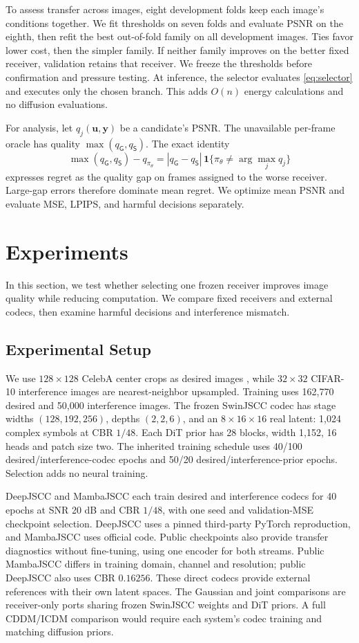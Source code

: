 \documentclass[conference]{IEEEtran}
\newcommand{\G}{\mathsf{G}}
\newcommand{\SIC}{\mathsf{S}}
\begin{document}
To assess transfer across images, eight development folds keep each image's
conditions together. We fit thresholds on seven folds and evaluate PSNR on
the eighth, then refit the best out-of-fold family on all development images.
Ties favor lower cost, then the simpler family. If neither
family improves on the better fixed receiver, validation retains that receiver.
We freeze the thresholds before confirmation and pressure testing. At inference,
the selector evaluates \eqref{eq:selector} and executes only the chosen branch.
This adds $O(n)$ energy calculations and no diffusion evaluations.

For analysis, let $q_j(\bm u,\bm y)$ be a candidate's PSNR. The unavailable
per-frame oracle has quality $\max(q_\G,q_\SIC)$. The exact identity
\begin{equation}
 \max(q_\G,q_\SIC)-q_{\pi_\theta}
 =|q_\G-q_\SIC|\,
 \mathbf1\{\pi_\theta\ne\arg\max_j q_j\}
 \label{eq:regret}
\end{equation}
expresses regret as the quality gap on frames assigned to the worse receiver.
Large-gap errors therefore dominate mean regret. We optimize mean PSNR and
evaluate MSE, LPIPS, and harmful decisions separately.

\section{Experiments}
\label{sec:experiments}
In this section, we test whether selecting one frozen receiver improves image
quality while reducing computation. We compare fixed receivers and external
codecs, then examine harmful decisions and interference mismatch.

\subsection{Experimental Setup}
We use $128\times128$ CelebA center crops as desired images
\cite{liu2015celeba}, while
$32\times32$ CIFAR-10 interference images are nearest-neighbor upsampled.
Training uses 162,770 desired and 50,000 interference images. The frozen
SwinJSCC codec has stage widths $(128,192,256)$, depths $(2,2,6)$, and an
$8\times16\times16$ real latent: 1,024 complex symbols at CBR $1/48$.
Each DiT prior has 28 blocks, width 1,152, 16 heads and patch size two.
The inherited training schedule uses 40/100 desired/interference-codec epochs
and 50/20 desired/interference-prior epochs. Selection adds no neural training.

DeepJSCC and MambaJSCC each train desired and interference codecs for 40 epochs
at SNR 20 dB and CBR $1/48$, with one seed and validation-MSE checkpoint
selection. DeepJSCC uses a pinned third-party PyTorch reproduction, and MambaJSCC
uses official code. Public checkpoints also provide transfer diagnostics
without fine-tuning, using one encoder for both streams. Public MambaJSCC
differs in training domain, channel and resolution; public DeepJSCC also uses
CBR $0.16256$. These direct codecs provide external references with their own
latent spaces. The Gaussian and joint comparisons are receiver-only ports
sharing frozen SwinJSCC weights and DiT priors. A full CDDM/ICDM comparison
would require each system's codec training and matching diffusion priors.
\end{document}
